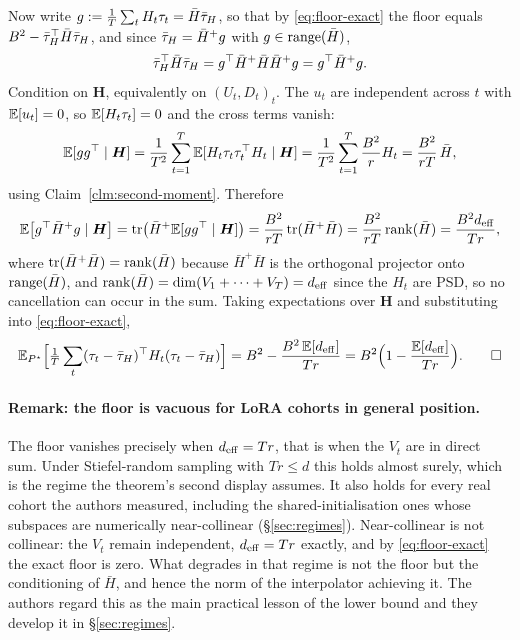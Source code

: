 Now write $g := \frac1T\sum_t H_t \tau_t = \bar H \bar{\tau}_H$, so that by
\eqref{eq:floor-exact} the floor equals $B^2 - \bar{\tau}_H^\top \bar H \bar{\tau}_H$, and
since $\bar{\tau}_H = \bar H^+ g$ with $g \in \operatorname{range}(\bar H)$,
\begin{equation*}
  \bar{\tau}_H^\top \bar H \bar{\tau}_H
  = g^\top \bar H^+ \bar H \bar H^+ g = g^\top \bar H^+ g .
\end{equation*}
Condition on $\boldsymbol H$, equivalently on $(U_t, D_t)_{t}$. The $u_t$ are
independent across $t$ with $\mathbb{E}[u_t] = 0$, so $\mathbb{E}[H_t\tau_t] = 0$ and the
cross terms vanish:
\begin{equation*}
  \mathbb{E}[g g^\top \mid \boldsymbol H]
  = \frac{1}{T^2}\sum_{t=1}^T \mathbb{E}[H_t\tau_t\tau_t^\top H_t \mid \boldsymbol H]
  = \frac{1}{T^2}\sum_{t=1}^T \frac{B^2}{r} H_t
  = \frac{B^2}{rT}\,\bar H ,
\end{equation*}
using Claim~\ref{clm:second-moment}. Therefore
\begin{equation*}
  \mathbb{E}\bigl[g^\top \bar H^+ g \mid \boldsymbol H\bigr]
  = \operatorname{tr}\bigl(\bar H^+ \mathbb{E}[g g^\top \mid \boldsymbol H]\bigr)
  = \frac{B^2}{rT}\operatorname{tr}(\bar H^+ \bar H)
  = \frac{B^2}{rT}\operatorname{rank}(\bar H)
  = \frac{B^2 d_{\mathrm{eff}}}{Tr},
\end{equation*}
where $\operatorname{tr}(\bar H^+\bar H) = \operatorname{rank}(\bar H)$ because $\bar H^+\bar H$ is the
orthogonal projector onto $\operatorname{range}(\bar H)$, and
$\operatorname{rank}(\bar H) = \dim(V_1 + \cdots + V_T) = d_{\mathrm{eff}}$ since the $H_t$ are PSD, so
no cancellation can occur in the sum. Taking expectations over
$\boldsymbol H$ and substituting into \eqref{eq:floor-exact},
\begin{equation*}
  \mathbb{E}_{P^\star}\Bigl[\tfrac1T\sum_t (\tau_t-\bar{\tau}_H)^\top H_t(\tau_t-\bar{\tau}_H)\Bigr]
  = B^2 - \frac{B^2\,\mathbb{E}[d_{\mathrm{eff}}]}{Tr}
  = B^2\Bigl(1 - \frac{\mathbb{E}[d_{\mathrm{eff}}]}{Tr}\Bigr).
  \tag*{$\square$}
\end{equation*}

\paragraph{Remark: the floor is vacuous for LoRA cohorts in general
position.} The floor vanishes precisely when $d_{\mathrm{eff}} = Tr$, that is when the
$V_t$ are in direct sum. Under Stiefel-random sampling with $Tr \leq d$ this
holds almost surely, which is the regime the theorem's second display
assumes. It also holds for every real cohort the authors measured, including the
shared-initialisation ones whose subspaces are numerically near-collinear
(\S\ref{sec:regimes}). Near-collinear is not collinear: the $V_t$ remain
independent, $d_{\mathrm{eff}} = Tr$ exactly, and by \eqref{eq:floor-exact} the exact
floor is zero. What degrades in that regime is not the floor but the
conditioning of $\bar H$, and hence the norm of the interpolator achieving it.
The authors regard this as the main practical lesson of the lower bound and they develop
it in \S\ref{sec:regimes}.

